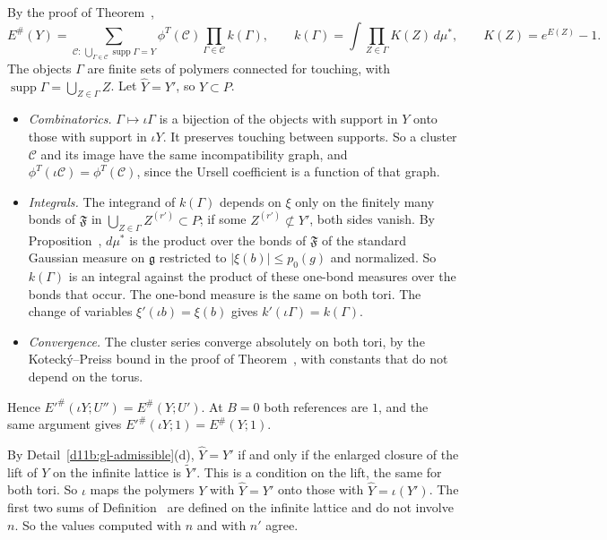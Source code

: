 \begin{step}[Outputs]
By the proof of Theorem~,
\[
E^\#(Y)=\sum_{\mathcal C:\,\bigcup_{\Gamma\in\mathcal C}\operatorname{supp}\Gamma=Y}\phi^T(\mathcal C)\prod_{\Gamma\in\mathcal C}k(\Gamma),\qquad k(\Gamma)=\int\prod_{Z\in\Gamma}K(Z)\,d\mu^*,\qquad K(Z)=e^{E(Z)}-1 .
\]
The objects $\Gamma$ are finite sets of polymers connected for touching, with $\operatorname{supp}\Gamma=\bigcup_{Z\in\Gamma}Z$. Let $\hat Y=Y'$, so $Y\subset P$.
\begin{itemize}
\item \emph{Combinatorics.} $\Gamma\mapsto\iota\Gamma$ is a bijection of the objects with support in $Y$ onto those with support in $\iota Y$. It preserves touching between supports. So a cluster $\mathcal C$ and its image have the same incompatibility graph, and $\phi^T(\iota\mathcal C)=\phi^T(\mathcal C)$, since the Ursell coefficient is a function of that graph.
\item \emph{Integrals.} The integrand of $k(\Gamma)$ depends on $\xi$ only on the finitely many bonds of $\mathfrak F$ in $\bigcup_{Z\in\Gamma}Z^{(r')}\subset P$; if some $Z^{(r')}\not\subset Y'$, both sides vanish. By Proposition~, $d\mu^*$ is the product over the bonds of $\mathfrak F$ of the standard Gaussian measure on $\mathfrak g$ restricted to $|\xi(b)|\le p_0(g)$ and normalized. So $k(\Gamma)$ is an integral against the product of these one-bond measures over the bonds that occur. The one-bond measure is the same on both tori. The change of variables $\xi'(\iota b)=\xi(b)$ gives $k'(\iota\Gamma)=k(\Gamma)$.
\item \emph{Convergence.} The cluster series converge absolutely on both tori, by the Kotecký--Preiss bound in the proof of Theorem~, with constants that do not depend on the torus.
\end{itemize}
Hence $E'^\#(\iota Y;U'')=E^\#(Y;U')$. At $B=0$ both references are $1$, and the same argument gives $E'^\#(\iota Y;1)=E^\#(Y;1)$.
\end{step}

\begin{step}
By Detail~\ref{d11b:gl-admissible}(d), $\hat Y=Y'$ if and only if the enlarged closure of the lift of $Y$ on the infinite lattice is $\tilde Y'$. This is a condition on the lift, the same for both tori. So $\iota$ maps the polymers $Y$ with $\hat Y=Y'$ onto those with $\hat Y=\iota(Y')$. The first two sums of Definition~ are defined on the infinite lattice and do not involve $n$. So the values computed with $n$ and with $n'$ agree.
\end{step}

